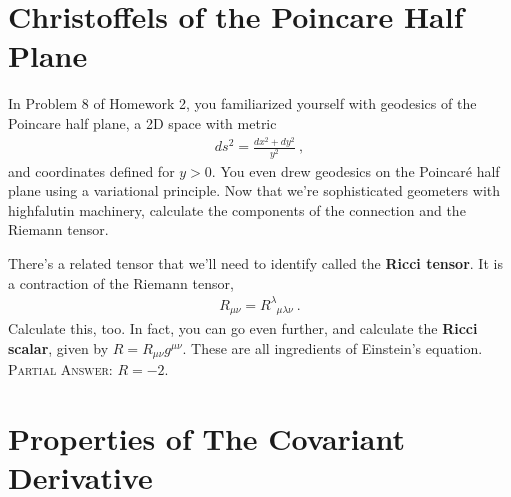 \documentclass[12pt]{article}
\numberwithin{equation}{section}    %
\begin{document}
\section{Christoffels of the Poincare Half Plane}


In Problem 8 of Homework 2, you familiarized yourself with geodesics of the Poincare half plane, a 2D space with metric
\begin{align}
	ds^2 = \frac{dx^2 + dy^2}{y^2} \ ,
\end{align}
and coordinates defined for $y>0$. You even drew geodesics on the Poincar\'e half plane using a variational principle. Now that we're sophisticated geometers with highfalutin machinery, calculate the components of the connection and the Riemann tensor.

There's a related tensor that we'll need to identify called the \textbf{Ricci tensor}. It is a contraction of the Riemann tensor,
\begin{align}
	R_{\mu\nu} = R^\lambda_{\phantom{\lambda}\mu\lambda\nu} \ .
\end{align}
Calculate this, too. In fact, you can go even further, and calculate the \textbf{Ricci scalar}, given by $R = R_{\mu\nu}g^{\mu\nu}$. These are all ingredients of Einstein's equation. \textsc{Partial Answer}: $R = -2$.

\section{Properties of The Covariant Derivative}

%
\end{document}
